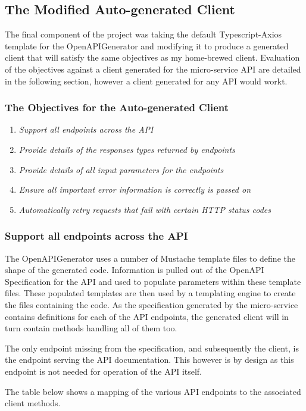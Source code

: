 \subsection{The Modified Auto-generated Client}
The final component of the project was taking the default Typescript-Axios template for the OpenAPIGenerator and modifying it to produce a generated client that will satisfy the same objectives as my home-brewed client. Evaluation of the objectives against a client generated for the micro-service API are detailed in the following section, however a client generated for any API would workt.
\subsubsection{The Objectives for the Auto-generated Client}
\begin{enumerate}
    \item \textit{Support all endpoints across the API}
    \item \textit{Provide details of the responses types returned by endpoints}
    \item \textit{Provide details of all input parameters for the endpoints}
    \item \textit{Ensure all important error information is correctly is passed on}
    \item \textit{Automatically retry requests that fail with certain HTTP status codes}
\end{enumerate}
\subsubsection{Support all endpoints across the API}
The OpenAPIGenerator uses a number of Mustache template files to define the shape of the generated code. Information is pulled out of the OpenAPI Specification for the API and used to populate parameters within these template files. These populated templates are then used by a templating engine to create the files containing the code. As the specification generated by the micro-service contains definitions for each of the API endpoints, the generated client will in turn contain methods handling all of them too. 

The only endpoint missing from the specification, and subsequently the client, is the endpoint serving the API documentation. This however is by design as this endpoint is not needed for operation of the API itself.

The table below shows a mapping of the various API endpoints to the associated client methods.

